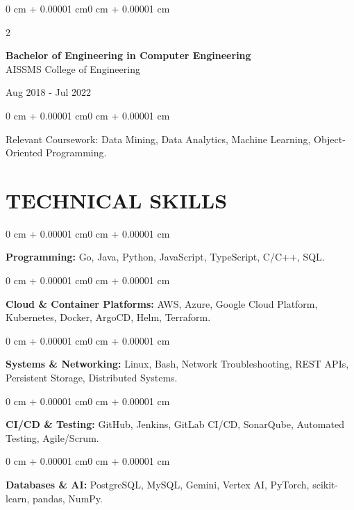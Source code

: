 \documentclass[10pt, letterpaper]{article}
\newenvironment{onecolentry}{
    \begin{adjustwidth}{0 cm + 0.00001 cm}{0 cm + 0.00001 cm}
}{
    \end{adjustwidth}
}
\newenvironment{twocolentry}[2][]{
    \onecolentry
    \def\secondColumn{#2}
    \setcolumnwidth{\fill, 4.5 cm}
    \begin{paracol}{2}
}{
    \switchcolumn \raggedleft \secondColumn
    \end{paracol}
    \endonecolentry
}
\begin{document}
\begin{twocolentry}{
    Aug 2018 - Jul 2022
}
    \textbf{Bachelor of Engineering in Computer Engineering} \\
    AISSMS College of Engineering
\end{twocolentry}
\begin{onecolentry}
Relevant Coursework: Data Mining, Data Analytics, Machine Learning, Object-Oriented Programming.
\end{onecolentry}
\section{TECHNICAL SKILLS}
\begin{onecolentry}
\textbf{Programming:} Go, Java, Python, JavaScript, TypeScript, C/C++, SQL.
\end{onecolentry}
\vspace{0.06 cm}
\begin{onecolentry}
\textbf{Cloud \& Container Platforms:} AWS, Azure, Google Cloud Platform, Kubernetes, Docker, ArgoCD, Helm, Terraform.
\end{onecolentry}
\vspace{0.06 cm}
\begin{onecolentry}
\textbf{Systems \& Networking:} Linux, Bash, Network Troubleshooting, REST APIs, Persistent Storage, Distributed Systems.
\end{onecolentry}
\vspace{0.06 cm}
\begin{onecolentry}
\textbf{CI/CD \& Testing:} GitHub, Jenkins, GitLab CI/CD, SonarQube, Automated Testing, Agile/Scrum.
\end{onecolentry}
\vspace{0.06 cm}
\begin{onecolentry}
\textbf{Databases \& AI:} PostgreSQL, MySQL, Gemini, Vertex AI, PyTorch, scikit-learn, pandas, NumPy.
\end{onecolentry}

\end{document}
